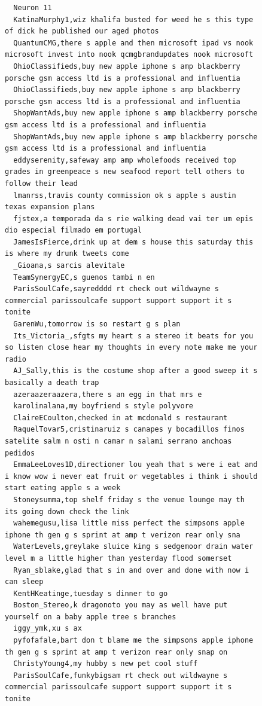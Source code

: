 \begin{figure}[htpb]
\begin{verbatim}
  Neuron 11
  KatinaMurphy1,wiz khalifa busted for weed he s this type of dick he published our aged photos
  QuantumCMG,there s apple and then microsoft ipad vs nook microsoft invest into nook qcmgbrandupdates nook microsoft
  OhioClassifieds,buy new apple iphone s amp blackberry porsche gsm access ltd is a professional and influentia
  OhioClassifieds,buy new apple iphone s amp blackberry porsche gsm access ltd is a professional and influentia
  ShopWantAds,buy new apple iphone s amp blackberry porsche gsm access ltd is a professional and influentia
  ShopWantAds,buy new apple iphone s amp blackberry porsche gsm access ltd is a professional and influentia
  eddyserenity,safeway amp amp wholefoods received top grades in greenpeace s new seafood report tell others to follow their lead
  lmanrss,travis county commission ok s apple s austin texas expansion plans
  fjstex,a temporada da s rie walking dead vai ter um epis dio especial filmado em portugal
  JamesIsFierce,drink up at dem s house this saturday this is where my drunk tweets come
  _Gioana,s sarcis alevitale
  TeamSynergyEC,s guenos tambi n en
  ParisSoulCafe,sayredddd rt check out wildwayne s commercial parissoulcafe support support support it s tonite
  GarenWu,tomorrow is so restart g s plan
  Its_Victoria_,sfgts my heart s a stereo it beats for you so listen close hear my thoughts in every note make me your radio
  AJ_Sally,this is the costume shop after a good sweep it s basically a death trap
  azeraazeraazera,there s an egg in that mrs e
  karolinalana,my boyfriend s style polyvore
  ClaireECoulton,checked in at mcdonald s restaurant
  RaquelTovar5,cristinaruiz s canapes y bocadillos finos satelite salm n osti n camar n salami serrano anchoas pedidos
  EmmaLeeLoves1D,directioner lou yeah that s were i eat and i know wow i never eat fruit or vegetables i think i should start eating apple s a week
  Stoneysumma,top shelf friday s the venue lounge may th its going down check the link
  wahemegusu,lisa little miss perfect the simpsons apple iphone th gen g s sprint at amp t verizon rear only sna
  WaterLevels,greylake sluice king s sedgemoor drain water level m a little higher than yesterday flood somerset
  Ryan_sblake,glad that s in and over and done with now i can sleep
  KentHKeatinge,tuesday s dinner to go
  Boston_Stereo,k dragonoto you may as well have put yourself on a baby apple tree s branches
  iggy_ymk,xu s ax
  pyfofafale,bart don t blame me the simpsons apple iphone th gen g s sprint at amp t verizon rear only snap on
  ChristyYoung4,my hubby s new pet cool stuff
  ParisSoulCafe,funkybigsam rt check out wildwayne s commercial parissoulcafe support support support it s tonite

\end{verbatim}
\end{figure}
